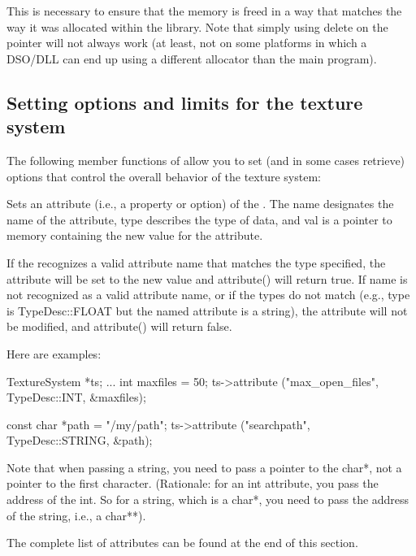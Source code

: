 This is necessary to ensure that the memory is freed in a way that
matches the way it was allocated within the library.  Note that simply
using {\cf delete} on the pointer will not always work (at least,
not on some platforms in which a DSO/DLL can end up using a different
allocator than the main program).
\apiend

\subsection{Setting options and limits for the texture system}
\label{sec:texturesys:api:options}

The following member functions of \TextureSystem allow you to set
(and in some cases retrieve) options that control the overall
behavior of the texture system:


Sets an attribute (i.e., a property or option) of the \TextureSystem.
The {\cf name} designates the name of the attribute, {\cf type}
describes the type of data, and {\cf val} is a pointer to memory 
containing the new value for the attribute.

If the \TextureSystem recognizes a valid attribute name that matches the
type specified, the attribute will be set to the new value and {\cf
  attribute()} will return {\cf true}.  If {\cf name} is not recognized
as a valid attribute name, or if the types do not match (e.g., {\cf
  type} is {\cf TypeDesc::FLOAT} but the named attribute is a string),
the attribute will not be modified, and {\cf attribute()} will return
{\cf false}.

Here are examples:

\begin{code}
      TextureSystem *ts; 
      ...
      int maxfiles = 50;
      ts->attribute ("max_open_files", TypeDesc::INT, &maxfiles);

      const char *path = "/my/path";
      ts->attribute ("searchpath", TypeDesc::STRING, &path);
\end{code}

Note that when passing a string, you need to pass a pointer to the {\cf
  char*}, not a pointer to the first character.  (Rationale: for an {\cf
  int} attribute, you pass the address of the {\cf int}.  So for a
string, which is a {\cf char*}, you need to pass the address of the
string, i.e., a {\cf char**}).

The complete list of attributes can be found at the end of this section.

